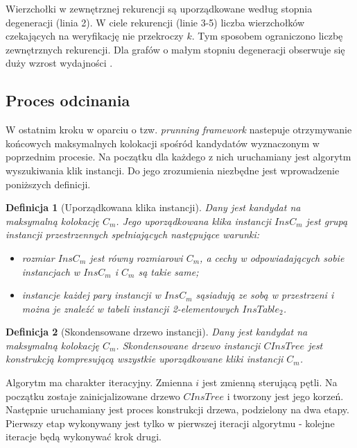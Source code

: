 \documentclass[12pt]{article}
\newtheorem{defin}{Definicja}
\begin{document}
Wierzchołki w zewnętrznej rekurencji są uporządkowane według stopnia degeneracji (linia 2). W ciele rekurencji (linie 3-5) liczba wierzchołków czekających na weryfikację nie przekroczy $ k $. Tym sposobem ograniczono liczbę zewnętrznych rekurencji. Dla grafów o małym stopniu degeneracji obserwuje się duży wzrost wydajności \cite{degenerat}.

\subsection{Proces odcinania}

W ostatnim kroku w oparciu o tzw. \textit{prunning framework} \cite{framework} nastepuje otrzymywanie końcowych maksymalnych kolokacji spośród kandydatów wyznaczonym w poprzednim procesie. Na początku dla każdego z nich uruchamiany jest algorytm wyszukiwania klik instancji. Do jego zrozumienia niezbędne jest wprowadzenie poniższych definicji.

\begin{defin}[Uporządkowana klika instancji]
Dany jest kandydat na maksymalną kolokację $ C_{m} $. Jego uporządkowana klika instancji $ InsC_{m} $ jest grupą instancji przestrzennych spełniających następujące warunki:
\begin{itemize}
\item rozmiar $ InsC_{m} $ jest równy rozmiarowi $ C_{m} $, a cechy w odpowiadających sobie instancjach w $ InsC_{m} $ i $ C_{m} $ są takie same; %
\item instancje każdej pary instancji w $ InsC_{m} $ sąsiadują ze sobą w przestrzeni i można je znaleźć w tabeli instancji 2-elementowych $ InsTable_{2} $.
\end{itemize}
\end{defin}

\begin{defin}[Skondensowane drzewo instancji]Dany jest kandydat na maksymalną kolokację $ C_{m} $. Skondensowane drzewo instancji $ CInsTree$ jest konstrukcją kompresującą wszystkie uporządkowane kliki instancji $ C_{m} $.
\end{defin}

Algorytm ma charakter iteracyjny. Zmienna $ i $ jest zmienną sterującą pętli. Na początku zostaje zainicjalizowane drzewo $ CInsTree $ i tworzony jest jego korzeń. Następnie uruchamiany jest proces konstrukcji drzewa, podzielony na dwa etapy. Pierwszy etap wykonywany jest tylko w pierwszej iteracji algorytmu - kolejne iteracje będą wykonywać krok drugi. 
\end{document}
